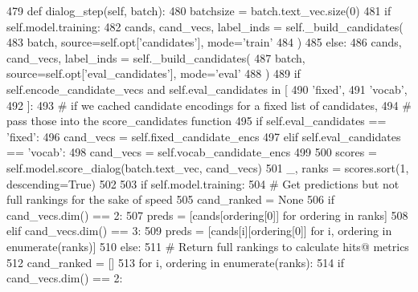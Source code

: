 \begin{DoxyCode}
479     \textcolor{keyword}{def }dialog\_step(self, batch):
480         batchsize = batch.text\_vec.size(0)
481         \textcolor{keywordflow}{if} self.model.training:
482             cands, cand\_vecs, label\_inds = self.\_build\_candidates(
483                 batch, source=self.opt[\textcolor{stringliteral}{'candidates'}], mode=\textcolor{stringliteral}{'train'}
484             )
485         \textcolor{keywordflow}{else}:
486             cands, cand\_vecs, label\_inds = self.\_build\_candidates(
487                 batch, source=self.opt[\textcolor{stringliteral}{'eval\_candidates'}], mode=\textcolor{stringliteral}{'eval'}
488             )
489             \textcolor{keywordflow}{if} self.encode\_candidate\_vecs \textcolor{keywordflow}{and} self.eval\_candidates \textcolor{keywordflow}{in} [
490                 \textcolor{stringliteral}{'fixed'},
491                 \textcolor{stringliteral}{'vocab'},
492             ]:
493                 \textcolor{comment}{# if we cached candidate encodings for a fixed list of candidates,}
494                 \textcolor{comment}{# pass those into the score\_candidates function}
495                 \textcolor{keywordflow}{if} self.eval\_candidates == \textcolor{stringliteral}{'fixed'}:
496                     cand\_vecs = self.fixed\_candidate\_encs
497                 \textcolor{keywordflow}{elif} self.eval\_candidates == \textcolor{stringliteral}{'vocab'}:
498                     cand\_vecs = self.vocab\_candidate\_encs
499 
500         scores = self.model.score\_dialog(batch.text\_vec, cand\_vecs)
501         \_, ranks = scores.sort(1, descending=\textcolor{keyword}{True})
502 
503         \textcolor{keywordflow}{if} self.model.training:
504             \textcolor{comment}{# Get predictions but not full rankings for the sake of speed}
505             cand\_ranked = \textcolor{keywordtype}{None}
506             \textcolor{keywordflow}{if} cand\_vecs.dim() == 2:
507                 preds = [cands[ordering[0]] \textcolor{keywordflow}{for} ordering \textcolor{keywordflow}{in} ranks]
508             \textcolor{keywordflow}{elif} cand\_vecs.dim() == 3:
509                 preds = [cands[i][ordering[0]] \textcolor{keywordflow}{for} i, ordering \textcolor{keywordflow}{in} enumerate(ranks)]
510         \textcolor{keywordflow}{else}:
511             \textcolor{comment}{# Return full rankings to calculate hits@ metrics}
512             cand\_ranked = []
513             \textcolor{keywordflow}{for} i, ordering \textcolor{keywordflow}{in} enumerate(ranks):
514                 \textcolor{keywordflow}{if} cand\_vecs.dim() == 2:

\end{DoxyCode}
